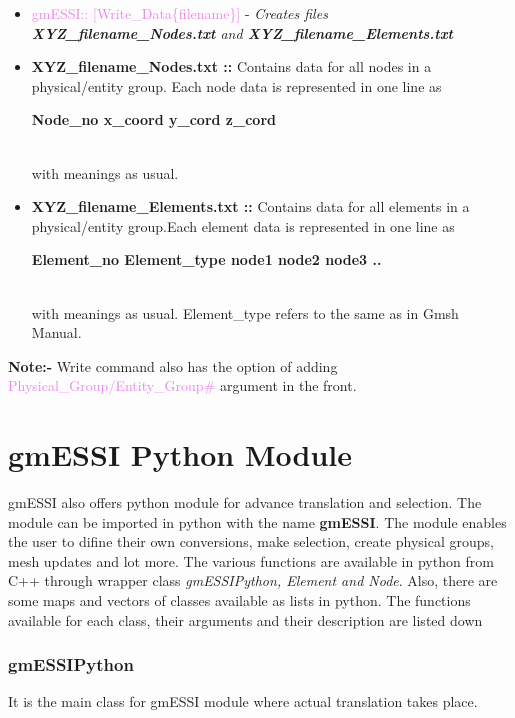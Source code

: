 \documentclass[11pt]{article}
\begin{document}
  \begin{itemize} 
    \item \textcolor{violet}{gmESSI:: [Write\_Data\{filename\}]} - \textit{Creates files \textbf{XYZ\_filename\_Nodes.txt} and \textbf{XYZ\_filename\_Elements.txt}} 
    \item \textbf{XYZ\_filename\_Nodes.txt ::} Contains data for all nodes in a physical/entity group. Each node data is represented in one line as \\
            \centerline{\textbf{Node\_no x\_coord y\_cord z\_cord}} \\
    with meanings as usual.
    \item \textbf{XYZ\_filename\_Elements.txt ::} Contains data for all elements in a physical/entity group.Each element data is represented in one line as \\
            \centerline{\textbf{Element\_no Element\_type node1 node2 node3 .. }} \\
    with meanings as usual. Element\_type refers to the same as in Gmsh Manual.
  \end{itemize}

\noindent \textbf{Note:-} Write command also has the option of adding \textcolor{violet}{Physical\_Group/Entity\_Group\#} argument in the front.

\section{gmESSI Python Module} 

gmESSI also offers python module for advance translation and selection. The module can be imported in python with the name \textbf{gmESSI}. The module enables the user to difine their own conversions, make selection, create physical groups, mesh updates and lot more. The various functions are available in python from C++ through wrapper class \textit{gmESSIPython, Element and Node}. Also, there are some maps and vectors of classes available as lists in python. The functions available for each class, their arguments and their description are listed down 

\subsubsection{gmESSIPython}
It is the main class for gmESSI module where actual translation takes place. 
\end{document}

